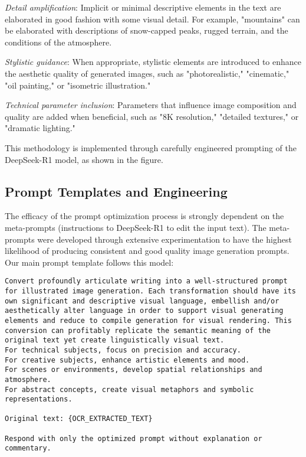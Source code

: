 \textit{Detail amplification}: Implicit or minimal descriptive elements in the text are elaborated in good fashion with some visual detail. For example, "mountains" can be elaborated with descriptions of snow-capped peaks, rugged terrain, and the conditions of the atmosphere.

\textit{Stylistic guidance}: When appropriate, stylistic elements are introduced to enhance the aesthetic quality of generated images, such as "photorealistic," "cinematic," "oil painting," or "isometric illustration."

\textit{Technical parameter inclusion}: Parameters that influence image composition and quality are added when beneficial, such as "8K resolution," "detailed textures," or "dramatic lighting."

This methodology is implemented through carefully engineered prompting of the DeepSeek-R1 model, as shown in the figure.


\subsection{Prompt Templates and Engineering}

The efficacy of the prompt optimization process is strongly dependent on the meta-prompts (instructions to DeepSeek-R1 to edit the input text). The meta-prompts were developed through extensive experimentation to have the highest likelihood of producing consistent and good quality image generation prompts. Our main prompt template follows this model:

\begin{verbatim}
Convert profoundly articulate writing into a well-structured prompt for illustrated image generation. Each transformation should have its own significant and descriptive visual language, embellish and/or aesthetically alter language in order to support visual generating elements and reduce to compile generation for visual rendering. This conversion can profitably replicate the semantic meaning of the original text yet create linguistically visual text.
For technical subjects, focus on precision and accuracy.
For creative subjects, enhance artistic elements and mood.
For scenes or environments, develop spatial relationships and atmosphere.
For abstract concepts, create visual metaphors and symbolic representations.

Original text: {OCR_EXTRACTED_TEXT}

Respond with only the optimized prompt without explanation or commentary.

\end{verbatim}

